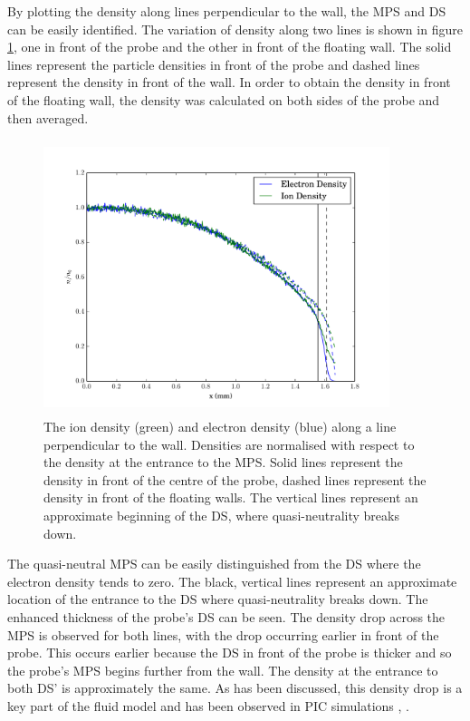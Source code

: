 By plotting the density along lines perpendicular to the wall, the MPS and DS can be easily identified. The variation of density along two lines is shown in figure \ref{fig:Densities}, one in front of the probe and the other in front of the floating wall. The solid lines represent the particle densities in front of the probe and dashed lines represent the density in front of the wall. In order to obtain the density in front of the floating wall, the density was calculated on both sides of the probe and then averaged.

\label{Section:benchmark}
\begin{figure}[H]
	\centering
	\includegraphics[width=0.9\textwidth, height = 8cm]{mps_densities.pdf}
	\caption{The ion density (green) and electron density (blue) along a line perpendicular to the wall. Densities are normalised with respect to the density at the entrance to the MPS. Solid lines represent the density in front of the centre of the probe, dashed lines represent the density in front of the floating walls. The vertical lines represent an approximate beginning of the DS, where quasi-neutrality breaks down. }
	\label{fig:Densities}
\end{figure}

The quasi-neutral MPS can be easily distinguished from the DS where the electron density tends to zero. The black, vertical lines represent an approximate location of the entrance to the DS where quasi-neutrality breaks down. The enhanced thickness of the probe's DS can be seen. The density drop across the MPS is observed for both lines, with the drop occurring earlier in front of the probe. This occurs earlier because the DS in front of the probe is thicker and so the probe's MPS begins further from the wall. The density at the entrance to both DS' is approximately the same. As has been discussed, this density drop is a key part of the fluid model \cite{fluid_model} and has been observed in PIC simulations \cite{bergmann_1994}, \cite{Chodura}. 

